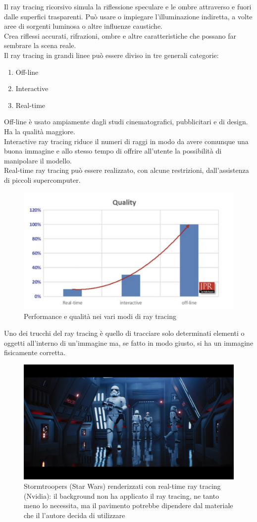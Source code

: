\documentclass[9pt,a4paper,twoside]{tau}
\begin{document}
Il ray tracing ricorsivo simula la riflessione speculare e le ombre attraverso e fuori dalle superfici trasparenti. Può usare o impiegare l'illuminazione indiretta, a volte aree di sorgenti luminosa o altre influenze caustiche.\\
Crea riflessi accurati, rifrazioni, ombre e altre caratteristiche che possano far sembrare la scena reale.\\
Il ray tracing in grandi linee può essere diviso in tre generali categorie:
\begin{enumerate}
	\item Off-line
	\item Interactive
	\item Real-time
\end{enumerate}
Off-line è usato ampiamente dagli studi cinematografici, pubblicitari e di design. Ha la qualità maggiore.\\
Interactive ray tracing riduce il numeri di raggi in modo da avere comunque una buona immagine e allo stesso tempo di offrire all'utente la possibilità di manipolare il modello.\\
Real-time ray tracing può essere realizzato, con alcune restrizioni, dall'assistenza di piccoli supercomputer.
\begin{figure}[H]
    \centering
    \includegraphics[width=0.7\columnwidth]{Figures/12.png}
    \caption{Performance e qualità nei vari modi di ray tracing}
    \label{fig:figure}
\end{figure}
Uno dei trucchi del ray tracing è quello di tracciare solo determinati elementi o oggetti all'interno di un'immagine ma, se fatto in modo giusto, si ha un immagine fisicamente corretta.  
\begin{figure}[H]
    \centering
    \includegraphics[width=0.7\columnwidth]{Figures/13.png}
    \caption{Stormtroopers (Star Wars) renderizzati con real-time ray tracing (Nvidia): il background non ha applicato il ray tracing, ne tanto meno lo necessita, ma il pavimento potrebbe dipendere dal materiale che il l'autore decida di utilizzare}
    \label{fig:figure}
\end{figure}
\end{document}
